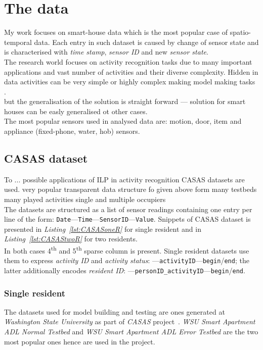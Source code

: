 \documentclass[12pt, a4paper, pdflatex, leqno, twoside, openright]{report}
\newcommand{\ts}{\textsuperscript}
\begin{document}
  \section{The data}
My work focuses on smart-house data which is the most popular case of spatio-temporal data. Each entry in such dataset is caused by change of sensor state and is characterised with \emph{time stamp}, \emph{sensor ID} and new \emph{sensor state}.\\
The research world focuses on activity recognition tasks due to many important applications and vast number of activities and their diverse complexity. Hidden in data activities can be very simple or highly complex making model making tasks .\\

but the generalisation of the solution is straight forward --- solution for smart houses can be easly generalised ot other cases.\\
The most popular sensors used in analysed data are: motion, door, item and appliance (fixed-phone, water, hob) sensors.

    \subsection{CASAS dataset}
To ... possible applications of ILP in activity recognition CASAS datasets are used.
very popular
transparent data structure fo given above form
many testbeds 
many played activities
single and multiple occupiers\\

The datasets are structured as a list of sensor readings containing one entry per line of the form: \texttt{Date}---\texttt{Time}---\texttt{SensorID}---\texttt{Value}. Snippets of CASAS dataset is presented in \emph{Listing~\ref{lst:CASASoneR}} for single resident and in \emph{Listing~\ref{lst:CASAStwoR}} for two residents.\\
In both cases 4\ts{th} and 5\ts{th} sparse column is present. Single resident datasets use them to express \emph{activity ID} and \emph{activity status}: ---\texttt{activityID}---\texttt{begin}/\texttt{end}; the latter additionally encodes \emph{resident ID}: ---\texttt{personID\_activityID}---\texttt{begin}/\texttt{end}.

      \subsubsection{Single resident}
The datasets used for model building and testing are ones generated at \emph{Washington State University} as part of \emph{CASAS} project~\citep{cook2009assessing}. \emph{WSU Smart Apartment ADL Normal Testbed} and \emph{WSU Smart Apartment ADL Error Testbed} are the two most popular ones hence are used in the project.\\
\end{document}

